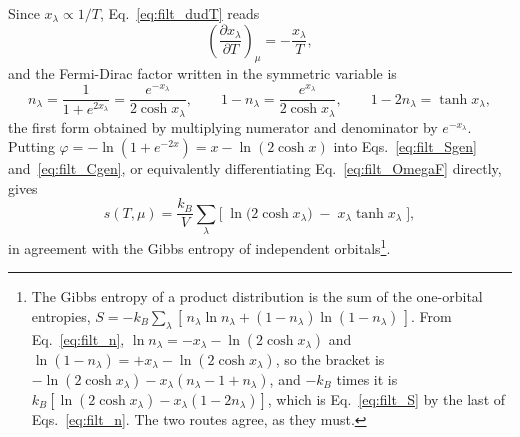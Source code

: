 \documentclass[10pt,a4paper]{article}
\theoremstyle{plain}
\theoremstyle{remark}
\begin{document}
Since $x_\lambda\propto1/T$, Eq.~\eqref{eq:filt_dudT} reads
\begin{equation}\label{eq:filt_dxdT}
\left(\frac{\partial x_\lambda}{\partial T}\right)_{\mu}=-\frac{x_\lambda}{T},
\end{equation}
and the Fermi-Dirac factor written in the symmetric variable is
\begin{equation}\label{eq:filt_n}
n_\lambda=\frac{1}{1+e^{2x_\lambda}}=\frac{e^{-x_\lambda}}{2\cosh x_\lambda},
\qquad
1-n_\lambda=\frac{e^{x_\lambda}}{2\cosh x_\lambda},
\qquad
1-2n_\lambda=\tanh x_\lambda ,
\end{equation}
the first form obtained by multiplying numerator and denominator by
$ e^{-x_\lambda} $. Putting $\varphi=-\ln(1+e^{-2x})=x-\ln(2\cosh x)$ into
Eqs.~\eqref{eq:filt_Sgen} and~\eqref{eq:filt_Cgen}, or equivalently
differentiating Eq.~\eqref{eq:filt_OmegaF} directly, gives
\begin{equation}\label{eq:filt_S}
s(T,\mu)=\frac{k_B}{V}\sum_\lambda\Big[\;\ln\big(2\cosh x_\lambda\big)
\;-\;x_\lambda\tanh x_\lambda\;\Big] ,
\end{equation}
in agreement with the Gibbs entropy of independent orbitals\footnote{The Gibbs
entropy of a product distribution is the sum of the one-orbital entropies,
$ S = -k_B\sum_\lambda[\,n_\lambda\ln n_\lambda+(1-n_\lambda)\ln(1-n_\lambda)\,] $.
From Eq.~\eqref{eq:filt_n}, $\ln n_\lambda=-x_\lambda-\ln(2\cosh x_\lambda)$ and
$\ln(1-n_\lambda)=+x_\lambda-\ln(2\cosh x_\lambda)$, so the bracket is
$ -\ln(2\cosh x_\lambda) - x_\lambda(n_\lambda - 1 + n_\lambda) $, and
$ -k_B $ times it is $ k_B[\ln(2\cosh x_\lambda) - x_\lambda(1-2n_\lambda)] $, which is
Eq.~\eqref{eq:filt_S} by the last of Eqs.~\eqref{eq:filt_n}. The two routes agree,
as they must.}.
\end{document}
